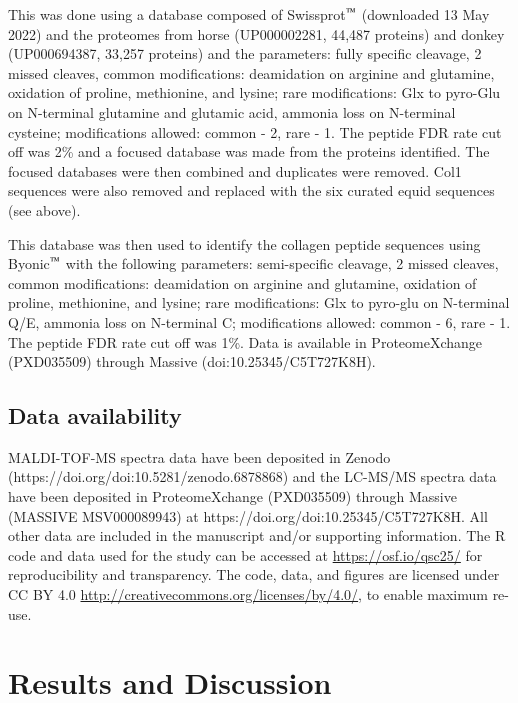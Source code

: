 \documentclass[preprint, 3p, authoryear]{elsarticle} %
\begin{document}
This was done using a database composed of Swissprot\(^\text{\texttrademark}\) (downloaded 13 May 2022) and the proteomes from horse (UP000002281, 44,487 proteins) and donkey (UP000694387, 33,257 proteins) and the parameters: fully specific cleavage, 2 missed cleaves, common modifications: deamidation on arginine and glutamine, oxidation of proline, methionine, and lysine; rare modifications: Glx to pyro-Glu on N-terminal glutamine and glutamic acid, ammonia loss on N-terminal cysteine; modifications allowed: common - 2, rare - 1. The peptide FDR rate cut off was 2\% and a focused database was made from the proteins identified. The focused databases were then combined and duplicates were removed. Col1 sequences were also removed and replaced with the six curated equid sequences (see above).

This database was then used to identify the collagen peptide sequences using Byonic\(^\text{\texttrademark}\) with the following parameters: semi-specific cleavage, 2 missed cleaves, common modifications: deamidation on arginine and glutamine, oxidation of proline, methionine, and lysine; rare modifications: Glx to pyro-glu on N-terminal Q/E, ammonia loss on N-terminal C; modifications allowed: common - 6, rare - 1. The peptide FDR rate cut off was 1\%. Data is available in ProteomeXchange (PXD035509) through Massive (doi:10.25345/C5T727K8H).

\hypertarget{data-availability}{%
\subsection{Data availability}\label{data-availability}}

MALDI-TOF-MS spectra data have been deposited in Zenodo (https://doi.org/doi:10.5281/zenodo.6878868) and the LC-MS/MS spectra data have been deposited in ProteomeXchange (PXD035509) through Massive (MASSIVE MSV000089943) at https://doi.org/doi:10.25345/C5T727K8H. All other data are included in the manuscript and/or supporting information. The R code and data used for the study can be accessed at \url{https://osf.io/qsc25/} for reproducibility and transparency. The code, data, and figures are licensed under CC BY 4.0 \url{http://creativecommons.org/licenses/by/4.0/}, to enable maximum re-use.

\hypertarget{results-and-discussion}{%
\section{Results and Discussion}\label{results-and-discussion}}
\end{document}
